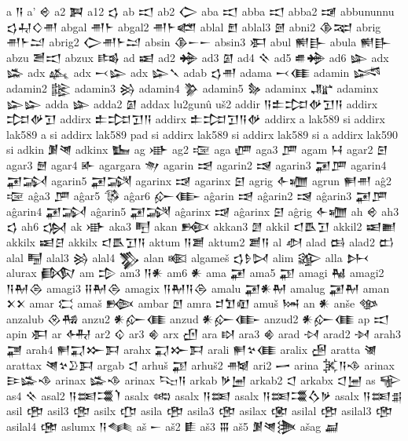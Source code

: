  a  𒀀   
 a'  𒄴   
 a2  𒀉   
 a12  𒌓   
 ab  𒀊   
 ab2  𒀖   
 aba  𒀊   
 abba  𒀊   
 abba2  𒀋   
 abbununnu  𒌓𒄷𒄭𒉣    
 abgal  𒉣𒈨    
 abgal2  𒉣𒈨𒅤    
 ablal  𒆼   
 ablal3  𒇦   
 abni2  𒆠𒉈    
 abrig  𒉣𒈨𒁺    
 abrig2  𒀖𒉣𒈨𒁺    
 absin  𒆠𒀸𒀸    
 absin3  𒀳   
 abul  𒆍𒃲    
 abula  𒆍𒃲    
 abzu  𒍪𒀊    
 abzux  𒌤   
 ad  𒀜   
 ad2  𒄉   
 ad3  𒇼   
 ad4  𒍞   
 ad5  𒌑𒄉    
 ad6  𒇿   
 adx  𒈕   
 adx  𒎉   
 adx  𒁁𒇽    
 adx  𒇽𒃵      
 adab  𒌓𒉣    
 adama  𒁁𒈪    
 adamin  𒈓   
 adamin2  𒈘   
 adamin3  𒄒   
 adamin4  𒉫   
 adamin5  𒂛   
 adaminx  𒂜   
 adaminx  𒇽𒇽    
 adda  𒇿   
 adda2  𒇼   
 addax  lu2gunû uš2  
 addir  𒀀𒉺𒄐𒉻𒋛𒀀    
 addirx  𒄐𒉻𒋛    
 addirx  𒉺𒄐𒋛𒀀    
 addirx  𒉺𒄐𒋛𒀀𒉻    
 addirx  a lak589 si   
 addirx  lak589 a si   
 addirx  lak589 pad si   
 addirx  lak589 si   
 addirx  lak589 si a   
 addirx  lak590 si   
 adkin  𒋠𒇴    
 adkinx  𒋁   
 ag  𒀝   
 ag2  𒉘   
 aga  𒂇   
 aga3  𒂆   
 agam  𒀂   
 agar2  𒇋   
 agar3  𒆻   
 agar4  𒅊   
 agargara  𒉩   
 agarin  𒀌   
 agarin2  𒀎   
 agarin3  𒂼𒂆    
 agarin4  𒂼𒋆    
 agarin5  𒂼𒋋    
 agarinx  𒀏   
 agarinx  𒇉   
 agrig  𒅆𒁾    
 agrun  𒂍𒉣    
 aĝ2  𒉘   
 aĝa3  𒂆   
 aĝar5  𒅐   
 aĝar6  𒅎𒂂    
 aĝarin  𒀌   
 aĝarin2  𒀎   
 aĝarin3  𒂼𒂆    
 aĝarin4  𒂼𒋆    
 aĝarin5  𒂼𒋋    
 aĝarinx  𒀏   
 aĝarinx  𒇉   
 aĝrig  𒅆𒁾    
 ah  𒄴   
 ah3  𒌓   
 ah6  𒌔   
 ak  𒀝   
 aka3  𒋃   
 akan  𒁛   
 akkan3  𒇖   
 akkil  𒃰𒋺𒋛    
 akkil2  𒀜𒆤    
 akkilx  𒀜𒆪    
 akkilx  𒃰𒋺𒋛𒀀    
 aktum  𒀀𒋢    
 aktum2  𒋢𒀀    
 al  𒀠   
 alad  𒆘   
 alad2  𒆗   
 alal  𒋄   
 alal3  𒄒   
 alal4  𒃺   
 alan  𒀩   
 algameš  𒌓𒊩𒄸    
 alim  𒄋   
 alla  𒉄   
 alurax  𒁃   
 am  𒄠   
 am3  𒀀𒀭    
 am6  𒀭   
 ama  𒂼   
 ama5  𒃣   
 amagi  𒈻   
 amagi2  𒀀𒈹𒁲    
 amagi3  𒍝𒈹𒁲    
 amagix  𒀀𒈹𒀀𒁲    
 amalu  𒂼𒀭𒈹    
 amalug  𒂼𒈹    
 aman  𒉽𒉽    
 amar  𒀫   
 amaš  𒁦   
 ambar  𒆹   
 amra  𒄑𒈣𒊏    
 amuš  𒀇   
 an  𒀭   
 anše  𒀲   
 anzalub  𒊮𒄀    
 anzu2  𒀭𒅎𒈪    
 anzud  𒀭𒅎𒂂    
 anzud2  𒀭𒅎𒈪    
 ap  𒀊   
 apin  𒀳   
 ar  𒅈   
 ar2  𒄱   
 ar3  𒄯   
 arx  𒌸   
 ara  𒊭   
 ara3  𒄯   
 arad  𒀴   
 arad2  𒀵   
 arah3  𒃥   
 arah4  𒂍𒍑𒁍𒁕    
 arahx  𒍑𒁍𒁕    
 arali  𒂍𒆳𒈪    
 aralix  𒌽   
 aratta  𒇶   
 arattax  𒇴𒆳𒊒𒁕    
 argab  𒀶   
 arhuš  𒃣   
 arhuš2  𒉦   
 ari2  𒅂   
 arina  𒈸𒀀𒈾    
 arinax  𒄿𒈕𒈾    
 arinax  𒈕𒈾    
 arinax  𒌫𒀀    
 arkab  𒃻𒅁    
 arkab2  𒀶   
 arkabx  𒀶𒅁    
 as  𒊍   
 as4  𒍞   
 asal2  𒀀𒌅𒃮𒇺    
 asalx  𒀷   
 asalx  𒀀𒌅    
 asalx  𒀀𒌅𒃮𒋝𒃻    
 asalx  𒀀𒌅𒉪    
 asil  𒂰   
 asil3  𒂢   
 asilx  𒂡   
 asila  𒂰   
 asila3  𒂢   
 asilax  𒂬   
 asilal  𒂰   
 asilal3  𒂢   
 asilal4  𒂤   
 aslumx  𒀀𒈝    
 aš  𒀸   
 aš2  𒀾   
 aš3  𒐋   
 aš5  𒋠𒇴𒋦    
 ašag  𒃷   
